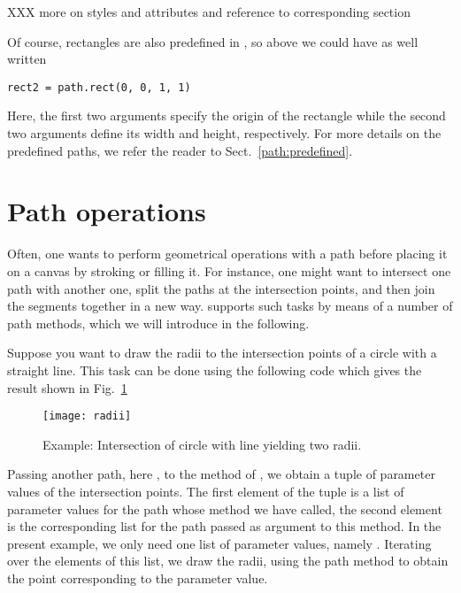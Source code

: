 XXX more on styles and attributes and reference to corresponding section

Of course, rectangles are also predefined in \PyX{}, so above we could
have as well written
\begin{verbatim}
rect2 = path.rect(0, 0, 1, 1)
\end{verbatim}
Here, the first two arguments specify the origin of the rectangle
while the second two arguments define its width and height,
respectively. For more details on the predefined paths, we
refer the reader to Sect.~\ref{path:predefined}.

\section{Path operations}

Often, one wants to perform geometrical operations with a path before
placing it on a canvas by stroking or filling it.  For instance, one
might want to intersect one path with another one, split the paths at
the intersection points, and then join the segments together in a new
way. \PyX{} supports such tasks by means of a number of path methods,
which we will introduce in the following.

Suppose you want to draw the radii to the intersection points of a
circle with a straight line. This task can be done using the following
code which gives the result shown in Fig.~\ref{fig:radii}

\begin{figure}
\centerline{\texttt{[image: radii]}}
\caption{Example: Intersection of circle with line yielding two radii.}
\label{fig:radii}
\end{figure}
Passing another path, here , to the  method
of , we obtain a tuple of parameter values of the
intersection points. The first element of the tuple is a list of
parameter values for the path whose  method we have
called, the second element is the corresponding list for the path
passed as argument to this method. In the present example, we only
need one list of parameter values, namely .
Iterating over the elements of this list, we draw the radii, using the
 path method to obtain the point corresponding to the
parameter value.

